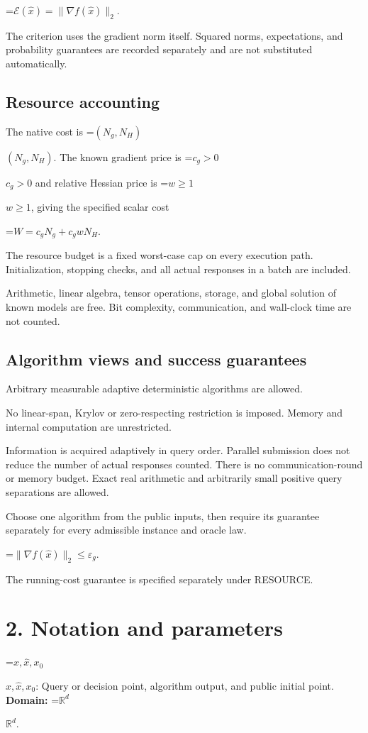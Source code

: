 \documentclass[10pt,a4paper]{article}
\newcommand{\AtlasMath}[1]{\par\begingroup\centering\setbox0=\hbox{$\displaystyle #1$}\ifdim\wd0>1.4\linewidth\typeout{ATLAS WIDE FORMULA: \the\wd0}\fi\ifdim\wd0>\linewidth\resizebox{\linewidth}{!}{\box0}\else\box0\fi\par\endgroup}
\newcommand{\AtlasInlineMath}[1]{\begingroup\setbox0=\hbox{$#1$}\ifdim\wd0>.4\linewidth\endgroup\AtlasMath{#1}\else\endgroup$#1$\fi}
\begin{document}
\AtlasMath{\mathcal{E}(\widehat{x})=\|\nabla f(\widehat{x})\|_2.}


The criterion uses the gradient norm itself. Squared norms, expectations, and probability guarantees are recorded separately and are not substituted automatically.

\subsection{Resource accounting}
The native cost is \AtlasInlineMath{(N_g,N_H)}. The known gradient price is \AtlasInlineMath{c_g>0} and relative Hessian price is \AtlasInlineMath{w\ge1}, giving the specified scalar cost


\AtlasMath{W=c_gN_g+c_gwN_H.}


The resource budget is a fixed worst-case cap on every execution path. Initialization, stopping checks, and all actual responses in a batch are included.

Arithmetic, linear algebra, tensor operations, storage, and global solution of known models are free. Bit complexity, communication, and wall-clock time are not counted.

\subsection{Algorithm views and success guarantees}
Arbitrary measurable adaptive deterministic algorithms are allowed.

No linear-span, Krylov or zero-respecting restriction is imposed. Memory and internal computation are unrestricted.

Information is acquired adaptively in query order. Parallel submission does not reduce the number of actual responses counted. There is no communication-round or memory budget. Exact real arithmetic and arbitrarily small positive query separations are allowed.

Choose one algorithm from the public inputs, then require its guarantee separately for every admissible instance and oracle law.


\AtlasMath{\|\nabla f(\widehat{x})\|_2\le \varepsilon_g.}


The running-cost guarantee is specified separately under RESOURCE.

\section{2. Notation and parameters}
\AtlasInlineMath{x,\widehat{x},x_0}: Query or decision point, algorithm output, and public initial point. \textbf{Domain:} \AtlasInlineMath{\mathbb{R}^d}.
\end{document}
